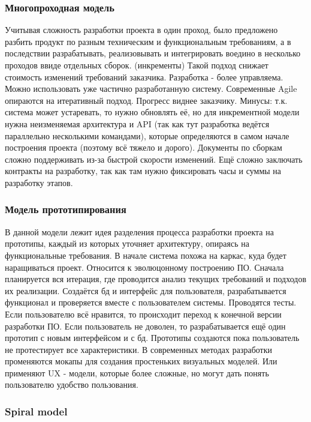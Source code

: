 \subsubsection{Многопроходная модель}

Учитывая сложность разработки проекта в один проход, было предложено разбить продукт по разным техническим и функциональным требованиям, а в последствии разрабатывать, реализовывать и интегрировать воедино в несколько проходов ввиде отдельных сборок. (инкременты)
Такой подход снижает стоимость изменений требований заказчика. Разработка - более управляема. 
Можно использовать уже частично разработанную систему. Современные Agile опираются на итеративный подход. Прогресс виднее заказчику.
Минусы: т.к. система может устаревать, то нужно обновлять её, но для инкрементной модели нужна неизменяемая архитектура и API (так как тут разработка ведётся параллельно несколькими командами), которые определяются в самом начале построения проекта (поэтому всё тяжело и дорого).
Документы по сборкам сложно поддерживать из-за быстрой скорости изменений.
Ещё сложно заключать контракты на разработку, так как там нужно фиксировать часы и суммы на разработку этапов.

\subsubsection{Модель прототипирования}

В данной модели лежит идея разделения процесса разработки проекта на прототипы, каждый из которых уточняет архитектуру, опираясь на функциональные требования. В начале система похожа на каркас, куда будет наращиваться проект. Относится к эволюцонному построению ПО.
Сначала планируется вся итерация, где проводится анализ текущих требований и подходов их реализации. Создаётся бд и интерфейс для пользователя, разрабатывается функционал и проверяется вместе с пользователем системы. Проводятся тесты. Если пользователю всё нравится, то происходит переход к конечной версии разработки ПО. 
Если пользователь не доволен, то разрабатывается ещё один прототип с новым интерфейсом и с бд. Прототипы создаются пока пользователь не протестирует все характеристики. 
В современных методах разработки променяются мокапы для создания простеньких визуальных моделей. Или применяют UX - модели, которые более сложные, но могут дать понять пользователю удобство пользования. 

\subsubsection{Spiral model}

